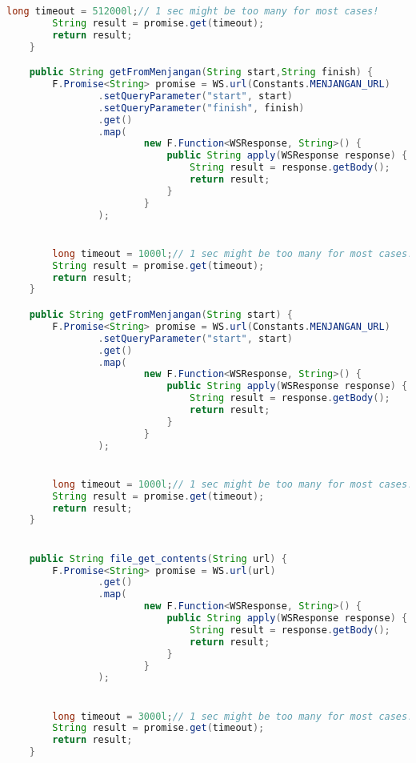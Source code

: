 \begin{lstlisting}[language=Java,basicstyle=\tiny,caption=Application.java]
        long timeout = 512000l;// 1 sec might be too many for most cases!
        String result = promise.get(timeout);
        return result;
    }

    public String getFromMenjangan(String start,String finish) {
        F.Promise<String> promise = WS.url(Constants.MENJANGAN_URL)
                .setQueryParameter("start", start)
                .setQueryParameter("finish", finish)
                .get()
                .map(
                        new F.Function<WSResponse, String>() {
                            public String apply(WSResponse response) {
                                String result = response.getBody();
                                return result;
                            }
                        }
                );


        long timeout = 1000l;// 1 sec might be too many for most cases!
        String result = promise.get(timeout);
        return result;
    }

    public String getFromMenjangan(String start) {
        F.Promise<String> promise = WS.url(Constants.MENJANGAN_URL)
                .setQueryParameter("start", start)
                .get()
                .map(
                        new F.Function<WSResponse, String>() {
                            public String apply(WSResponse response) {
                                String result = response.getBody();
                                return result;
                            }
                        }
                );


        long timeout = 1000l;// 1 sec might be too many for most cases!
        String result = promise.get(timeout);
        return result;
    }


    public String file_get_contents(String url) {
        F.Promise<String> promise = WS.url(url)
                .get()
                .map(
                        new F.Function<WSResponse, String>() {
                            public String apply(WSResponse response) {
                                String result = response.getBody();
                                return result;
                            }
                        }
                );


        long timeout = 3000l;// 1 sec might be too many for most cases!
        String result = promise.get(timeout);
        return result;
    }



\end{lstlisting}
